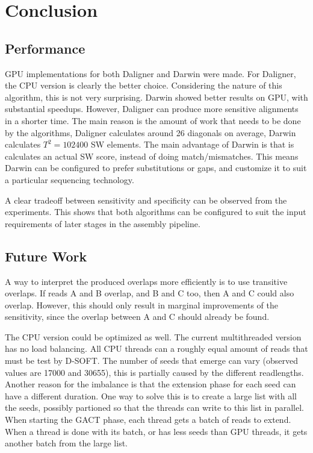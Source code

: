\documentclass[../main/thesis.tex]{subfiles}
\begin{document}
\chapter{Conclusion}
\ifdefined\main
\else

\fi

\section{Performance}
GPU implementations for both Daligner and Darwin were made.
For Daligner, the CPU version is clearly the better choice.
Considering the nature of this algorithm, this is not very surprising.
Darwin showed better results on GPU, with substantial speedups. %
However, Daligner can produce more sensitive alignments in a shorter time.
The main reason is the amount of work that needs to be done by the algorithms, Daligner calculates around 26 diagonals on average, Darwin calculates $T^2=102400$ SW elements.
The main advantage of Darwin is that is calculates an actual SW score, instead of doing match/mismatches.
This means Darwin can be configured to prefer substitutions or gaps, and customize it to suit a particular sequencing technology.

A clear tradeoff between sensitivity and specificity can be observed from the experiments.
This shows that both algorithms can be configured to suit the input requirements of later stages in the assembly pipeline.


\section{Future Work}





A way to interpret the produced overlaps more efficiently is to use transitive overlaps.
If reads A and B overlap, and B and C too, then A and C could also overlap.
However, this should only result in marginal improvements of the sensitivity, since the overlap between A and C should already be found.



The CPU version could be optimized as well.
The current multithreaded version has no load balancing.
All CPU threads can a roughly equal amount of reads that must be test by D-SOFT.
The number of seeds that emerge can vary (observed values are 17000 and 30655), this is partially caused by the different readlengths.
Another reason for the imbalance is that the extension phase for each seed can have a different duration.
One way to solve this is to create a large list with all the seeds, possibly partioned so that the threads can write to this list in parallel.
When starting the GACT phase, each thread gets a batch of reads to extend.
When a thread is done with its batch, or has less seeds than GPU threads, it gets another batch from the large list.
\end{document}
